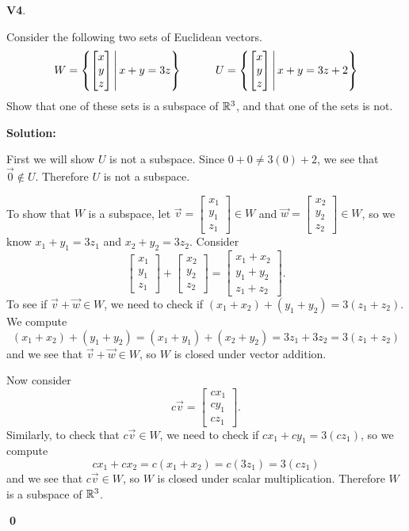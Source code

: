 \documentclass{article}
\newenvironment{problem}[1]
{
  \begin{flushleft}
  \textbf{#1}.
  \ignorespaces
}
{
  \end{flushleft}
}
\newenvironment{solution}
{
  \ignorespaces
  \textbf{Solution:}
}
{
  \ignorespacesafterend
  \begin{flushright}
  {\bfseries \qed}
  \end{flushright}
}
\begin{document}
\begin{problem}{V4}
Consider the following two sets of Euclidean vectors.
\[
  W = \left\{\begin{bmatrix} x \\ y \\ z \end{bmatrix}\,\middle|\,x+y=3z\right\}
\hspace{3em}
  U = \left\{\begin{bmatrix} x \\ y \\ z \end{bmatrix}\,\middle|\,x+y=3z+2\right\}
\]
Show that one of these sets is a subspace of \(\mathbb{R}^3\), and
that one of the sets is not.
\end{problem}
\begin{solution}
First we will show \(U\) is not a subspace.  Since \(0+0\not=3(0)+2\),
we see that \(\vec 0\not\in U\). Therefore \(U\) is not a subspace.

To show that \(W\) is a subspace, let
\(
  \vec v=\begin{bmatrix} x_1 \\y_1 \\ z_1 \end{bmatrix}\in W
\) and
\(
  \vec w=\begin{bmatrix} x_2 \\y_2 \\ z_2 \end{bmatrix} \in W
\),
so we know \(x_1+y_1=3z_1\) and \(x_2+y_2=3z_2\).
Consider
\[
\begin{bmatrix} x_1 \\y_1 \\ z_1 \end{bmatrix}
+\begin{bmatrix} x_2 \\y_2 \\ z_2 \end{bmatrix}
=\begin{bmatrix} x_1+x_2 \\y_1+y_2 \\ z_1+z_2 \end{bmatrix}
.\]
To see if \(\vec{v}+\vec{w} \in W\), we need to check if \( (x_1+x_2)+(y_1+y_2) = 3(z_1+z_2)\).
We compute
\[
  (x_1+x_2)+(y_1+y_2) = (x_1+y_1)+(x_2+y_2) = 3z_1+3z_2=3(z_1+z_2)
\]
and we see that \(\vec v+\vec w\in W\), so \(W\) is closed under vector addition.

Now consider
\[
c\vec v
=\begin{bmatrix} cx_1 \\cy_1 \\ cz_1 \end{bmatrix}
.\]
Similarly, to check that \(c\vec{v} \in W\), we need to check if \(cx_1+cy_1=3(cz_1)\), so we compute
\[cx_1+cx_2 = c(x_1+x_2)=c(3z_1)=3(cz_1)\]
and we see that \(c\vec v\in W\), so \(W\) is closed under scalar 
multiplication. Therefore \(W\) is a subspace of \(\mathbb{R}^3\).
\end{solution}
\end{document}
